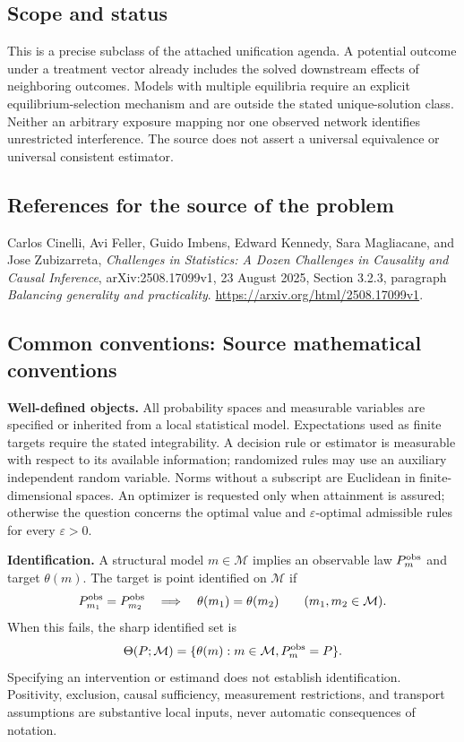 \documentclass[11pt,a4paper]{article}
\begin{document}
\subsection*{Scope and status}
This is a precise subclass of the attached unification agenda. A potential outcome under a treatment vector already includes the solved downstream effects of neighboring outcomes. Models with multiple equilibria require an explicit equilibrium-selection mechanism and are outside the stated unique-solution class. Neither an arbitrary exposure mapping nor one observed network identifies unrestricted interference. The source does not assert a universal equivalence or universal consistent estimator.
\subsection*{References for the source of the problem}
Carlos Cinelli, Avi Feller, Guido Imbens, Edward Kennedy, Sara Magliacane, and Jose Zubizarreta, \emph{Challenges in Statistics: A Dozen Challenges in Causality and Causal Inference}, arXiv:2508.17099v1, 23 August 2025, Section 3.2.3, paragraph \emph{Balancing generality and practicality}. \url{https://arxiv.org/html/2508.17099v1}.

\subsection*{Common conventions: Source mathematical conventions}

\textbf{Well-defined objects.}
All probability spaces and measurable variables are specified or inherited
from a local statistical model. Expectations used as finite targets require
the stated integrability. A decision rule or estimator is measurable with
respect to its available information; randomized rules may use an auxiliary
independent random variable. Norms without a subscript are Euclidean in
finite-dimensional spaces. An optimizer is requested only when attainment
is assured; otherwise the question concerns the optimal value and
$\varepsilon$-optimal admissible rules for every $\varepsilon>0$.

\textbf{Identification.}
A structural model $m\in\mathcal M$ implies an observable law
$P_m^{\rm obs}$ and target $\theta(m)$. The target is point identified on
$\mathcal M$ if
\[
 P_{m_1}^{\rm obs}=P_{m_2}^{\rm obs}
 \quad\Longrightarrow\quad\theta(m_1)=\theta(m_2)
 \qquad(m_1,m_2\in\mathcal M).
\]
When this fails, the sharp identified set is
\[
 \Theta(P;\mathcal M)=\{\theta(m):m\in\mathcal M,
                                  P_m^{\rm obs}=P\}.
\]
Specifying an intervention or estimand does not establish identification.
Positivity, exclusion, causal sufficiency, measurement restrictions, and
transport assumptions are substantive local inputs, never automatic
consequences of notation.
\end{document}
